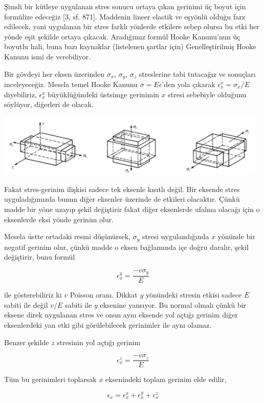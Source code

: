 \documentclass[12pt,fleqn]{article}\usepackage{../../common}
\begin{document}
Şimdi bir kütleye uygulanan stres sonucu ortaya çıkan gerinimi üç boyut için
formülize edeceğiz [3, sf. 871]. Maddenin lineer elastik ve eşyönlü olduğu farz
edilecek, yani uygulanan bir stres farklı yönlerde etkilere sebep olursa bu etki
her yönde eşit şekilde ortaya çıkacak. Aradığımız formül Hooke Kanunu'nun üç
boyutlu hali, buna bazı kaynaklar (listelenen şartlar için) Genelleştirilmiş
Hooke Kanunu ismi de verebiliyor.

Bir gövdeyi her eksen üzerinden $\sigma_x$, $\sigma_y$, $\sigma_z$ streslerine
tabi tutacağız ve sonuçları inceleyeceğiz. Mesela temel Hooke Kanunu $\sigma = E
\epsilon$'den yola çıkarak $\epsilon_x^x = \sigma_x / E$ diyebiliriz,
$\epsilon_x^x$ büyüklüğündeki üstsimge gerinimin $x$ stresi sebebiyle olduğunu
söylüyor, diğerleri de olacak.

\includegraphics[width=35em]{phy_020_strs_00_10.jpg}

Fakat stres-gerinim ilişkisi sadece tek eksenle kısıtlı değil. Bir eksende stres
uyguladığımızda bunun diğer eksenler üzerinde de etkileri olacaktır.  Çünkü
madde bir yöne uzayıp şekil değiştirir fakat diğer eksenlerde ufalma olacağı
için o eksenlerde eksi yönde gerinim olur.

Mesela üstte ortadaki resmi düşünürsek, $\sigma_y$ stresi uygulandığında $x$
yönünde bir negatif gerinim olur, çünkü madde o eksen bağlamında içe doğru
daralır, şekil değiştirir, bunu formül

$$
\epsilon_x^y =  \frac{- v \sigma_y}{E}
$$

ile gösterebiliriz ki $v$ Poisson oranı. Dikkat $y$ yönündeki stresin etkisi
sadece $E$ sabiti ile değil $v/E$ sabiti ile $y$ eksenine yansıyor. Bu normal
olmalı çünkü bir eksene direk uygulanan stres ve onun aynı eksende yol açtığı
gerinim diğer eksenlerdeki yan etki gibi görülebilecek gerinimler ile aynı
olamaz.

Benzer şekilde $z$ stresinin yol açtığı gerinim

$$
\epsilon_x^z =  \frac{- v \sigma_z}{E}
$$

Tüm bu gerinimleri toplarsak $x$ eksenindeki toplam gerinim elde edilir,

$$
\epsilon_x = \epsilon_x^x + \epsilon_x^y + \epsilon_x^z
$$
\end{document}
